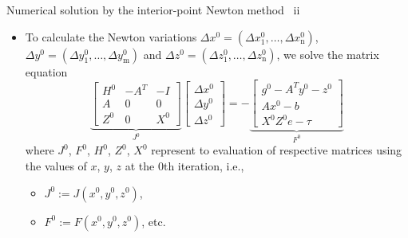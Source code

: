 %
\begin{frame}{Numerical solution by the interior-point Newton method \, ii}
\begin{itemize}
\item To calculate the Newton variations ${\Delta x^{0}=(\Delta x_{1}^{0},\ldots,\Delta x_{\text{n}}^{0})}$,
${\Delta y^{0}=(\Delta y_{1}^{0},\ldots,\Delta y_{\text{m}}^{0})}$
and ${\Delta z^{0}=(\Delta z_{1}^{0},\ldots,\Delta z_{\text{n}}^{0})}$,
we solve the matrix equation 
%
\[
\underset{J^{0}}{\underbrace{\begin{bmatrix}H^{0} & -A^{T} & -I\\
A & 0 & 0\\
Z^{0} & 0 & X^{0}
\end{bmatrix}}}\begin{bmatrix}\Delta x^{0}\\
\Delta y^{0}\\
\Delta z^{0}
\end{bmatrix}=-\underset{F^{0}}{\underbrace{\begin{bmatrix}g^{0}-A^{T}y^{0}-z^{0}\\
Ax^{0}-b\\
X^{0}Z^{0}e-\tau
\end{bmatrix}}}
\]
%
where $J^{0}$, $F^{0}$, $H^{0}$, $Z^{0}$, $X^{0}$ represent to evaluation of respective matrices using the values of $x$, $y$, $z$ at the 0th iteration, i.e., 
\begin{itemize}
	\item $J^{0} := J(x^0, y^0, z^0)$, 
	\item $F^{0} := F(x^0, y^0, z^0)$, etc.
\end{itemize}
%
\end{itemize}
\end{frame}
%
%
